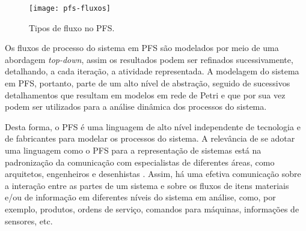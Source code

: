 \begin{figure}[htb]
	\centering
	\texttt{[image: pfs-fluxos]}
	\caption{Tipos de fluxo no PFS.}
	\label{fig:pfs-fluxos}
\end{figure}

Os fluxos de processo do sistema em PFS são modelados por meio de uma abordagem \textit{top-down}, assim os resultados podem ser refinados sucessivamente, detalhando, a cada iteração, a atividade representada. A modelagem do sistema em PFS, portanto, parte de um alto nível de abstração, seguido de sucessivos detalhamentos que resultam em modelos em rede de Petri e que por sua vez podem ser utilizados para a análise dinâmica dos processos do sistema.

Desta forma, o PFS é uma linguagem de alto nível independente de tecnologia e de fabricantes para modelar os processos do sistema. A relevância de se adotar uma linguagem como o PFS para a representação de sistemas está na padronização da comunicação com especialistas de diferentes áreas, como arquitetos, engenheiros e desenhistas \cite{pisching2018pfs}. Assim, há uma efetiva comunicação sobre a interação entre as partes de um sistema e sobre os fluxos de itens materiais e/ou de informação em diferentes níveis do sistema em análise, como, por exemplo, produtos, ordens de serviço, comandos para máquinas, informações de sensores, etc.
